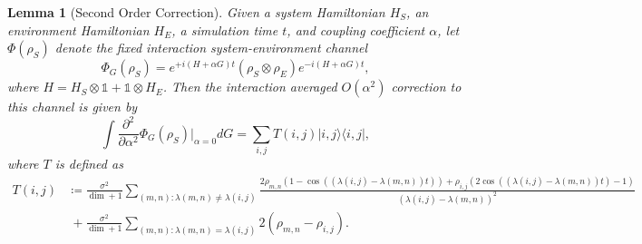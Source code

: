 \documentclass{article}
\newtheorem{lemma}[theorem]{Lemma}
\newcommand{\ketbra}[2]{| #1\rangle\! \langle #2|}
\newcommand{\bigo}[1]{O\left( #1 \right)}
\newcommand{\identity}{\mathds{1}}
\begin{document}
\begin{lemma}[Second Order Correction]
    Given a system Hamiltonian $H_{S}$, an environment Hamiltonian $H_{E}$, a simulation time $t$, and coupling coefficient $\alpha$, let $\Phi(\rho_S)$ denote the fixed interaction system-environment channel 
    \begin{equation}
        \Phi_G(\rho_S) = e^{+i (H + \alpha G)t} (\rho_S \otimes \rho_E) e^{-i (H + \alpha G)t},
    \end{equation}
    where $H = H_S \otimes \identity + \identity \otimes H_E$. 
    Then the interaction averaged $\bigo{\alpha^2}$ correction to this channel is given by
    \begin{equation}
        \int \frac{\partial^2}{\partial \alpha^2} \Phi_G(\rho_S) \bigg|_{\alpha = 0} dG = \sum_{i,j} T(i,j) \ketbra{i, j}{i, j},
    \end{equation}
    where $T$ is defined as
    \begin{align}
        T(i, j) &\coloneqq \frac{\sigma^2}{\dim + 1} \sum_{(m,n) : \lambda(m,n) \neq \lambda(i,j)} \frac{2 \rho_{m,n}(1 - \cos ((\lambda(i,j) - \lambda(m,n))t)) + \rho_{i,j} (2 \cos ((\lambda(i,j) - \lambda(m,n))t) - 1 )}{(\lambda(i,j) - \lambda(m,n))^2} \\
        &~ + \frac{\sigma^2}{\dim + 1} \sum_{(m,n) : \lambda(m,n) = \lambda(i,j)} 2 (\rho_{m,n} - \rho_{i,j}).
    \end{align}

\end{lemma}
\end{document}
